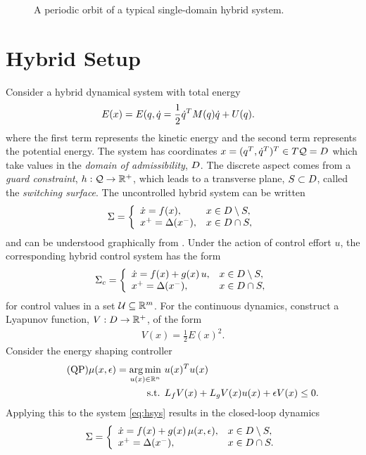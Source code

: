 \begin{figure}
  \centering
  \def\svgwidth{0.6\columnwidth}
  
  \caption{A periodic orbit of a typical single-domain hybrid system.}
  \label{fig:hsys}
\end{figure}

\section*{Hybrid Setup}
Consider a hybrid dynamical system with total energy
\begin{align*}
  E(x) &= E(q, \dot{q} = \frac{1}{2} \dot{q}^{T} M(q) \dot{q} + U(q).
\end{align*}
where the first term represents the kinetic energy and the second term represents the potential energy.
%
The system has coordinates $x = (q^T, \dot{q}^T)^T \in T\mathcal{Q} = D$ which take values in the {\em domain of admissibility}, $D$.
%
The discrete aspect comes from a {\em guard constraint}, $h : \mathcal{Q} \to \mathbb{R}^{+}$, which leads to a transverse plane, $S \subset D$, called the {\em switching surface}.
%
The uncontrolled hybrid system can be written
\begin{align}
  \Sigma = \left\{
  \begin{array}{l l}
    {\dot x} = f(x), & x \in D \setminus S,\\
    x^{+} = \Delta(x^{-}), &x \in D \cap S,
  \end{array}\right.
  \label{eq:hsys}
\end{align}
and can be understood graphically from .
%
Under the action of control effort $u$, the corresponding hybrid control system has the form
\begin{align}
  \Sigma_{c} = \left\{
  \begin{array}{l l}
    {\dot x} = f(x) + g(x) \, u, & x \in D \setminus S,\\
    x^{+} = \Delta(x^{-}), &x \in D \cap S,
  \end{array}\right.
  \label{eq:csys}
\end{align}
for control values in a set $\mathcal{U} \subseteq \mathbb{R}^{m}$.
%
For the continuous dynamics, construct a Lyapunov function, $V : D \to \mathbb{R}^{+}$, of the form
\begin{align}
  \label{eq:lyap}
  V(x) = \frac{1}{2} E(x)^2.
\end{align}
Consider the energy shaping controller
\begin{align}
  \label{eq:es-qp} \tag {QP}
  \mu(x, \epsilon) = \operatorname*{arg\,min}_{u(x) \in \mathbb{R}^{n}} \ & u(x)^T u(x)\\
  \nonumber
  \mbox{s.t. } & L_{f} V(x) + L_{g} V(x) u(x) + \epsilon V(x) \leq 0.
\end{align}
Applying this to the system \eqref{eq:hsys} results in the closed-loop dynamics
\begin{align}
  \label{eq:hsys-cl}
  \Sigma = \left\{
  \begin{array}{l l}
    {\dot x} = f(x) + g(x) \, \mu(x, \epsilon), & x \in D \setminus S,\\
    x^{+} = \Delta(x^{-}), &x \in D \cap S.
  \end{array}\right.
\end{align}

